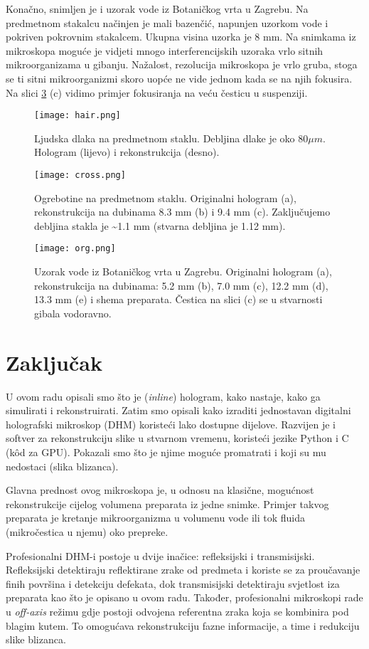 \documentclass[hidelinks]{ferseminar}
\begin{document}
Konačno, snimljen je i uzorak vode iz Botaničkog vrta u Zagrebu. Na predmetnom stakalcu načinjen je mali bazenčić, napunjen uzorkom vode i pokriven pokrovnim stakalcem. Ukupna visina uzorka je 8 mm. Na snimkama iz mikroskopa moguće je vidjeti mnogo interferencijskih uzoraka vrlo sitnih mikroorganizama u gibanju. Nažalost, rezolucija mikroskopa je vrlo gruba, stoga se ti sitni mikroorganizmi skoro uopće ne vide jednom kada se na njih fokusira. Na slici \ref{org} (c) vidimo primjer fokusiranja na veću česticu u suspenziji.

\begin{figure}
	\centering
	\texttt{[image: hair.png]}
	\caption{Ljudska dlaka na predmetnom staklu. Debljina dlake je oko $80 \mu{m}$. Hologram (lijevo) i rekonstrukcija (desno).}
	\label{hair}
\end{figure}

\begin{figure}
	\centering
	\texttt{[image: cross.png]}
	\caption{Ogrebotine na predmetnom staklu. Originalni hologram (a), rekonstrukcija na dubinama 8.3 mm (b) i 9.4 mm (c). Zaključujemo debljina stakla je \textasciitilde1.1 mm (stvarna debljina je 1.12 mm).}
	\label{cross}
\end{figure}

\begin{figure}
	\centering
	\texttt{[image: org.png]}
	\caption{Uzorak vode iz Botaničkog vrta u Zagrebu. Originalni hologram (a), rekonstrukcija na dubinama: 5.2 mm (b), 7.0 mm (c), 12.2 mm (d), 13.3 mm (e) i shema preparata. Čestica na slici (c) se u stvarnosti gibala vodoravno.}
	\label{org}
\end{figure}

\section{Zaključak}
U ovom radu opisali smo što je (\emph{inline}) hologram, kako nastaje, kako ga simulirati i rekonstruirati. Zatim smo opisali kako izraditi jednostavan digitalni holografski mikroskop (DHM) koristeći lako dostupne dijelove. Razvijen je i softver za rekonstrukciju slike u stvarnom vremenu, koristeći jezike Python i C (k\^{o}d za GPU). Pokazali smo što je njime moguće promatrati i koji su mu nedostaci (slika blizanca).

Glavna prednost ovog mikroskopa je, u odnosu na klasične, mogućnost rekonstrukcije cijelog volumena preparata iz jedne snimke. Primjer takvog preparata je kretanje mikroorganizma u volumenu vode ili tok fluida (mikročestica u njemu) oko prepreke.

Profesionalni DHM-i postoje u dvije inačice: refleksijski i transmisijski. Refleksijski detektiraju reflektirane zrake od predmeta i koriste se za proučavanje finih površina i detekciju defekata, dok transmisijski detektiraju svjetlost iza preparata kao što je opisano u ovom radu. Također, profesionalni mikroskopi rade u \emph{off-axis} režimu gdje postoji odvojena referentna zraka koja se kombinira pod blagim kutem. To omogućava rekonstrukciju fazne informacije, a time i redukciju slike blizanca.
\vfill\null

\nocite{*}


\end{document}

